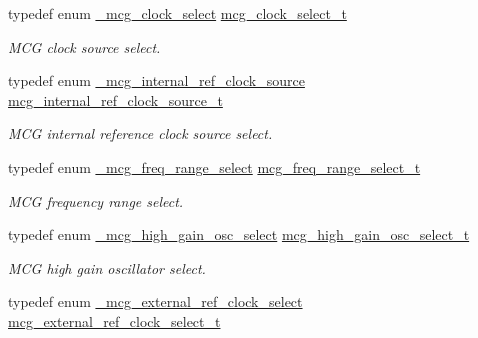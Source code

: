 \begin{DoxyCompactItemize}
\item 
typedef enum \hyperlink{group__mcg__hal_ga47d0604aecdca071e276eaf3ce1cb9bf}{\+\_\+mcg\+\_\+clock\+\_\+select} \hyperlink{group__mcg__hal_ga8494b9ebcf3f7e7c55953bcea489c955}{mcg\+\_\+clock\+\_\+select\+\_\+t}\hypertarget{group__mcg__hal_ga8494b9ebcf3f7e7c55953bcea489c955}{}\label{group__mcg__hal_ga8494b9ebcf3f7e7c55953bcea489c955}

\begin{DoxyCompactList}\small\item\em M\+CG clock source select. \end{DoxyCompactList}\item 
typedef enum \hyperlink{group__mcg__hal_gaef0cd9fa7c07747ebc03669ab129bc70}{\+\_\+mcg\+\_\+internal\+\_\+ref\+\_\+clock\+\_\+source} \hyperlink{group__mcg__hal_ga028f85c3ebde35432de06ae88332175f}{mcg\+\_\+internal\+\_\+ref\+\_\+clock\+\_\+source\+\_\+t}\hypertarget{group__mcg__hal_ga028f85c3ebde35432de06ae88332175f}{}\label{group__mcg__hal_ga028f85c3ebde35432de06ae88332175f}

\begin{DoxyCompactList}\small\item\em M\+CG internal reference clock source select. \end{DoxyCompactList}\item 
typedef enum \hyperlink{group__mcg__hal_ga56b8270f800b5d5bf01cfcfbe31e92c4}{\+\_\+mcg\+\_\+freq\+\_\+range\+\_\+select} \hyperlink{group__mcg__hal_ga20da1d947b18677a23085ae9763ed8f4}{mcg\+\_\+freq\+\_\+range\+\_\+select\+\_\+t}\hypertarget{group__mcg__hal_ga20da1d947b18677a23085ae9763ed8f4}{}\label{group__mcg__hal_ga20da1d947b18677a23085ae9763ed8f4}

\begin{DoxyCompactList}\small\item\em M\+CG frequency range select. \end{DoxyCompactList}\item 
typedef enum \hyperlink{group__mcg__hal_gaeab01c9e03d024b157294ff39a9f1708}{\+\_\+mcg\+\_\+high\+\_\+gain\+\_\+osc\+\_\+select} \hyperlink{group__mcg__hal_ga7218a02fa6a0189cb9b1e4e521bd682b}{mcg\+\_\+high\+\_\+gain\+\_\+osc\+\_\+select\+\_\+t}\hypertarget{group__mcg__hal_ga7218a02fa6a0189cb9b1e4e521bd682b}{}\label{group__mcg__hal_ga7218a02fa6a0189cb9b1e4e521bd682b}

\begin{DoxyCompactList}\small\item\em M\+CG high gain oscillator select. \end{DoxyCompactList}\item 
typedef enum \hyperlink{group__mcg__hal_ga1248a3efe4e5c66ad261e731a0f4576c}{\+\_\+mcg\+\_\+external\+\_\+ref\+\_\+clock\+\_\+select} \hyperlink{group__mcg__hal_ga9644a6c2e01b6262770ade769051224d}{mcg\+\_\+external\+\_\+ref\+\_\+clock\+\_\+select\+\_\+t}\hypertarget{group__mcg__hal_ga9644a6c2e01b6262770ade769051224d}{}\label{group__mcg__hal_ga9644a6c2e01b6262770ade769051224d}


\end{DoxyCompactItemize}

